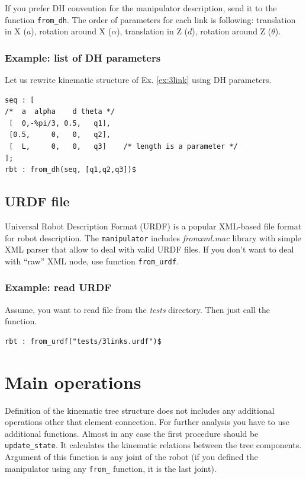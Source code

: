 \documentclass{article}
\begin{document}
If you prefer DH convention for the manipulator description, send it to the function \texttt{from\_dh}. The order of parameters for each link is following: translation in X ($a$), rotation around X ($\alpha$), translation in Z ($d$), rotation around Z ($\theta$). 

\subsubsection{Example: list of DH parameters}

Let us rewrite kinematic structure of Ex. \ref{ex:3link} using DH parameters.

\begin{verbatim}
seq : [
/*  a  alpha    d theta */
 [  0,-%pi/3, 0.5,   q1],   
 [0.5,     0,   0,   q2],  
 [  L,     0,   0,   q3]    /* length is a parameter */
];
rbt : from_dh(seq, [q1,q2,q3])$
\end{verbatim}

\subsection{URDF file}

Universal Robot Description Format (URDF) is a popular XML-based file format for robot description. The \texttt{manipulator} includes \textit{fromxml.mac} library with simple XML parser that allow to deal with valid URDF files. If you don't want to deal with ``raw'' XML node, use function \texttt{from\_urdf}. 

\subsubsection{Example: read URDF}

Assume, you want to read file from the \textit{tests} directory. Then just call the function.
\begin{verbatim}
rbt : from_urdf("tests/3links.urdf")$
\end{verbatim}

\section{Main operations}

Definition of the kinematic tree structure does not includes any additional operations other that element connection. For further analysis you have to use additional functions. Almost in any case the first procedure should be \texttt{update\_state}. It calculates the kinematic relations between the tree components. Argument of this function is any joint of the robot (if you defined the manipulator using any \texttt{from\_} function, it is the last joint). 
\end{document}
